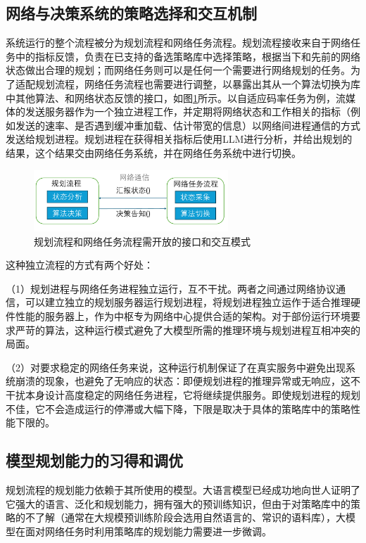 \subsection{网络与决策系统的策略选择和交互机制}
系统运行的整个流程被分为规划流程和网络任务流程。规划流程接收来自于网络任务中的指标反馈，负责在已支持的备选策略库中选择策略，根据当下和先前的网络状态做出合理的规划；而网络任务则可以是任何一个需要进行网络规划的任务。为了适配规划流程，网络任务流程也需要进行调整，以暴露出其从一个算法切换为库中其他算法、和网络状态反馈的接口，如图\ref{fig_llmcc_api}所示。以自适应码率任务为例，流媒体的发送服务器作为一个独立进程工作，并定期将网络状态和工作相关的指标（例如发送的速率、是否遇到缓冲重加载、估计带宽的信息）以网络间进程通信的方式发送给规划进程。规划进程在获得相关指标后使用LLM进行分析，并给出规划的结果，这个结果交由网络任务系统，并在网络任务系统中进行切换。

\begin{figure} [ht]
\centering
\includegraphics[width=0.65\textwidth]{figures/chap04/API.pdf} 
\caption{规划流程和网络任务流程需开放的接口和交互模式}
\label{fig_llmcc_api}
\end{figure}


这种独立流程的方式有两个好处：

（1）规划进程与网络任务进程独立运行，互不干扰。两者之间通过网络协议通信，可以建立独立的规划服务器运行规划进程，将规划进程独立运作于适合推理硬件性能的服务器上，作为中枢专为网络中心提供合适的架构。对于部份运行环境要求严苛的算法，这种运行模式避免了大模型所需的推理环境与规划进程互相冲突的局面。

（2）对要求稳定的网络任务来说，这种运行机制保证了在真实服务中避免出现系统崩溃的现象，也避免了无响应的状态：即便规划进程的推理异常或无响应，这不干扰本身设计高度稳定的网络任务进程，它将继续提供服务。即使规划进程的规划不佳，它不会造成运行的停滞或大幅下降，下限是取决于具体的策略库中的策略性能下限的。

\subsection{模型规划能力的习得和调优}
规划流程的规划能力依赖于其所使用的模型。大语言模型已经成功地向世人证明了它强大的语言、泛化和规划能力，拥有强大的预训练知识，但由于对策略库中的策略的不了解（通常在大规模预训练阶段会选用自然语言的、常识的语料库），大模型在面对网络任务时利用策略库的规划能力需要进一步微调。

